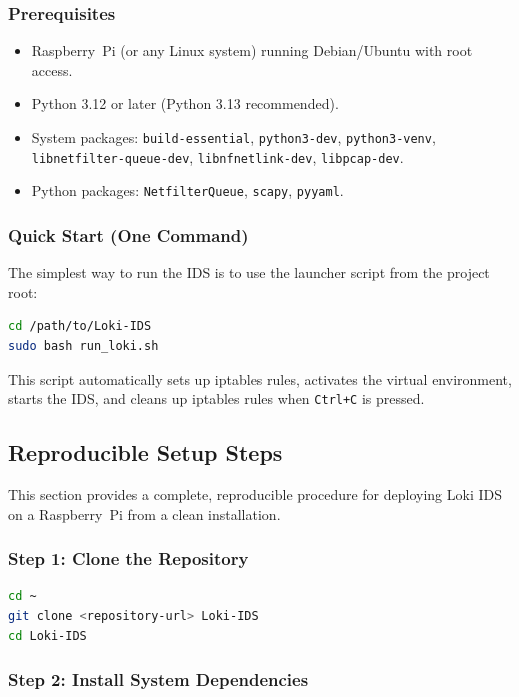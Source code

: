 \documentclass[12pt,a4paper]{article}
\begin{document}
\subsubsection*{Prerequisites}
\begin{itemize}
    \item Raspberry~Pi (or any Linux system) running Debian/Ubuntu with root access.
    \item Python 3.12 or later (Python 3.13 recommended).
    \item System packages: \texttt{build-essential}, \texttt{python3-dev}, \texttt{python3-venv}, \texttt{libnetfilter-queue-dev}, \texttt{libnfnetlink-dev}, \texttt{libpcap-dev}.
    \item Python packages: \texttt{NetfilterQueue}, \texttt{scapy}, \texttt{pyyaml}.
\end{itemize}

\subsubsection*{Quick Start (One Command)}

The simplest way to run the IDS is to use the launcher script from the project root:

\begin{lstlisting}[language=bash]
cd /path/to/Loki-IDS
sudo bash run_loki.sh
\end{lstlisting}

This script automatically sets up iptables rules, activates the virtual environment, starts the IDS, and cleans up iptables rules when \texttt{Ctrl+C} is pressed.

\subsection{Reproducible Setup Steps}
\label{sec:ids_steps}

This section provides a complete, reproducible procedure for deploying Loki IDS on a Raspberry~Pi from a clean installation.

\subsubsection*{Step 1: Clone the Repository}

\begin{lstlisting}[language=bash]
cd ~
git clone <repository-url> Loki-IDS
cd Loki-IDS
\end{lstlisting}

\subsubsection*{Step 2: Install System Dependencies}
\end{document}
